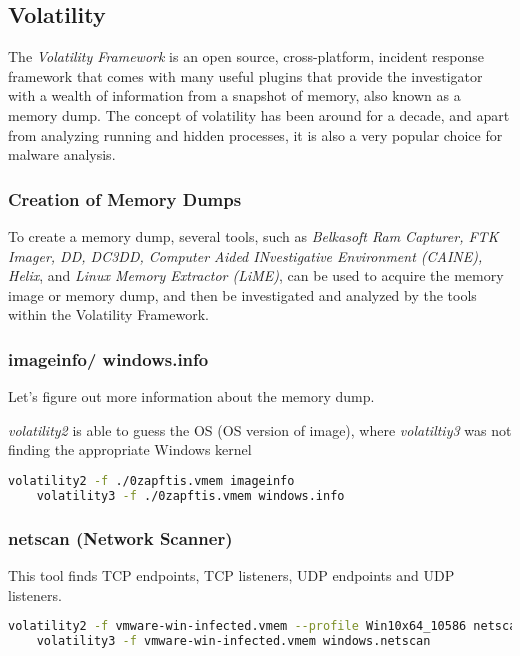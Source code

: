 

\subsection{Volatility}
The \textit{Volatility Framework} is an open source, cross-platform, incident response framework that comes with many useful plugins that provide the investigator with a wealth of information from a snapshot of memory, also known as a memory dump. The concept of volatility has been around for a decade, and apart from analyzing running and hidden processes, it is also a very popular choice for malware analysis.

\subsubsection{Creation of Memory Dumps}
To create a memory dump, several tools, such as \textit{Belkasoft Ram Capturer, FTK Imager, DD, DC3DD, Computer Aided INvestigative Environment (CAINE), Helix}, and \textit{Linux Memory Extractor (LiME)}, can be used to acquire the memory image or memory dump, and then be investigated and analyzed by the tools within the Volatility Framework.

\subsubsection{imageinfo/ windows.info}
Let's figure out more information about the memory dump.

\textit{volatility2} is able to guess the OS (OS version of image), where \textit{volatiltiy3} was not finding the appropriate Windows kernel

\begin{lstlisting}[language=bash]
    volatility2 -f ./0zapftis.vmem imageinfo
    volatility3 -f ./0zapftis.vmem windows.info
\end{lstlisting}

\subsubsection{netscan (Network Scanner)}
This tool finds TCP endpoints, TCP listeners, UDP endpoints and UDP listeners.

\begin{lstlisting}[language=bash]
    volatility2 -f vmware-win-infected.vmem --profile Win10x64_10586 netscan
    volatility3 -f vmware-win-infected.vmem windows.netscan
\end{lstlisting}

